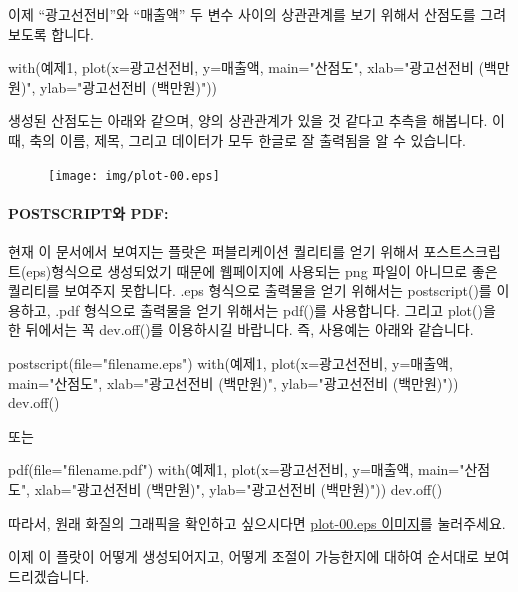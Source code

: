 이제 ``광고선전비''와 ``매출액'' 두 변수 사이의 상관관계를 보기 위해서 산점도를 그려보도록 합니다.

\begin{Schunk}
\begin{Soutput}	
with(예제1, plot(x=광고선전비, y=매출액, main="산점도", xlab="광고선전비 (백만원)", ylab="광고선전비 (백만원)"))
\end{Soutput}
\end{Schunk}

생성된 산점도는 아래와 같으며, 양의 상관관계가 있을 것 같다고 추측을 해봅니다.
이때, 축의 이름, 제목, 그리고 데이터가 모두 한글로 잘 출력됨을 알 수 있습니다.

\begin{figure}
\begin{center}
\texttt{[image: img/plot-00.eps]}
\end{center}
\end{figure}

\paragraph{POSTSCRIPT와 PDF:} 현재 이 문서에서 보여지는 플랏은 퍼블리케이션 퀄리티를 얻기 위해서 포스트스크립트(eps)형식으로 생성되었기 때문에 웹페이지에 사용되는 png 파일이 아니므로 좋은 퀄리티를 보여주지 못합니다.
.eps 형식으로 출력물을 얻기 위해서는 postscript()를 이용하고, .pdf 형식으로 출력물을 얻기 위해서는 pdf()를 사용합니다. 
그리고 plot()을 한 뒤에서는 꼭 dev.off()를 이용하시길 바랍니다. 
즉, 사용예는 아래와 같습니다. 

\begin{Schunk}
\begin{Soutput}	
postscript(file="filename.eps")
with(예제1, plot(x=광고선전비, y=매출액, main="산점도", xlab="광고선전비 (백만원)", ylab="광고선전비 (백만원)"))
dev.off()

또는 

pdf(file="filename.pdf")
with(예제1, plot(x=광고선전비, y=매출액, main="산점도", xlab="광고선전비 (백만원)", ylab="광고선전비 (백만원)"))
dev.off()
\end{Soutput}
\end{Schunk}


따라서, 원래 화질의 그래픽을 확인하고 싶으시다면 \href{http://korea.gnu.org/gnustats/img/plot-00.eps}{plot-00.eps 이미지}를 눌러주세요. 

이제 이 플랏이 어떻게 생성되어지고, 어떻게 조절이 가능한지에 대하여 순서대로 보여드리겠습니다.

